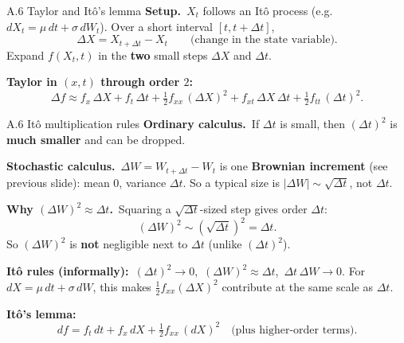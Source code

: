 \documentclass[11pt,aspectratio=169]{beamer}
\begin{document}
\begin{frame}{A.6 Taylor and It\^o's lemma}
  \hypertarget{sec:ito-lemma}{}
  \footnotesize
  \textbf{Setup.}\
  $X_t$ follows an It\^o process (e.g.\ $dX_t=\mu\,dt+\sigma\,dW_t$).
  Over a short interval $[t,t+\Delta t]$,
  \[
    \Delta X = X_{t+\Delta t}-X_t
    \qquad\text{(change in the state variable).}
  \]
  Expand $f(X_t,t)$ in the \textbf{two} small steps $\Delta X$ and $\Delta t$.

  \medskip
  \textbf{Taylor in $(x,t)$ through order $2$:}
  \[
    \Delta f
    \approx f_x\,\Delta X + f_t\,\Delta t
    + \tfrac12 f_{xx}\,(\Delta X)^2
    + f_{xt}\,\Delta X\,\Delta t
    + \tfrac12 f_{tt}\,(\Delta t)^2.
  \]
\end{frame}

\begin{frame}{A.6 It\^o multiplication rules}
  \footnotesize
  \textbf{Ordinary calculus.}\
  If $\Delta t$ is small, then $(\Delta t)^2$ is \textbf{much smaller} and can be dropped.

  \medskip
  \textbf{Stochastic calculus.}\
  $\Delta W=W_{t+\Delta t}-W_t$ is one \textbf{Brownian increment} (see previous slide):
  mean $0$, variance $\Delta t$.
  So a typical size is $|\Delta W|\sim\sqrt{\Delta t}$, not $\Delta t$.

  \medskip
  \textbf{Why $(\Delta W)^2\approx \Delta t$.}\
  Squaring a $\sqrt{\Delta t}$-sized step gives order $\Delta t$:
  \[
    (\Delta W)^2 \sim (\sqrt{\Delta t})^2 = \Delta t.
  \]
  So $(\Delta W)^2$ is \textbf{not} negligible next to $\Delta t$ (unlike $(\Delta t)^2$).

  \medskip
  \textbf{It\^o rules (informally):}\
  $(\Delta t)^2\to 0$,\ $(\Delta W)^2\approx \Delta t$,\ $\Delta t\,\Delta W\to 0$.
  For $dX=\mu\,dt+\sigma\,dW$, this makes $\tfrac12 f_{xx}(\Delta X)^2$ contribute at the
  same scale as $\Delta t$.

  \medskip
  \textbf{It\^o's lemma:}
  \[
    df = f_t\,dt + f_x\,dX + \tfrac12 f_{xx}\,(dX)^2
    \quad\text{(plus higher-order terms).}
  \]
\end{frame}
\end{document}
